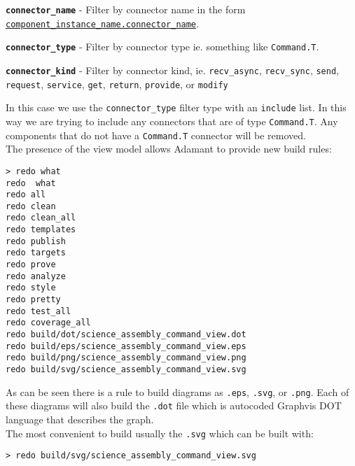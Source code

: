 \vspace{5mm} %
\begin{spaceditemize}
  \item \textbf{\texttt{connector\_name}} - Filter by connector name in the form \texttt{\url{component\_instance\_name.connector\_name}}.
  \item \textbf{\texttt{connector\_type}} - Filter by connector type ie. something like \texttt{Command.T}.
  \item \textbf{\texttt{connector\_kind}} - Filter by connector kind, ie. \texttt{recv\_async}, \texttt{recv\_sync}, \texttt{send}, \texttt{request}, \texttt{service}, \texttt{get}, \texttt{return}, \texttt{provide}, or \texttt{modify}
\end{spaceditemize}
\vspace{5mm} %

In this case we use the \texttt{connector\_type} filter type with an \texttt{include} list. In this way we are trying to include any connectors that are of type \texttt{Command.T}. Any components that do not have a \texttt{Command.T} connector will be removed. \\

The presence of the view model allows Adamant to provide new build rules:

\vspace{5mm} %
\begin{verbatim}
> redo what
redo  what
redo all
redo clean
redo clean_all
redo templates
redo publish
redo targets
redo prove
redo analyze
redo style
redo pretty
redo test_all
redo coverage_all
redo build/dot/science_assembly_command_view.dot
redo build/eps/science_assembly_command_view.eps
redo build/png/science_assembly_command_view.png
redo build/svg/science_assembly_command_view.svg
\end{verbatim}
\vspace{5mm} %

As can be seen there is a rule to build diagrams as \texttt{.eps}, \texttt{.svg}, or \texttt{.png}. Each of these diagrams will also build the \texttt{.dot} file which is autocoded Graphvis DOT language that describes the graph. \\

The most convenient to build usually the \texttt{.svg} which can be built with:

\vspace{5mm} %
\begin{verbatim}
> redo build/svg/science_assembly_command_view.svg
\end{verbatim}
\vspace{5mm} %


